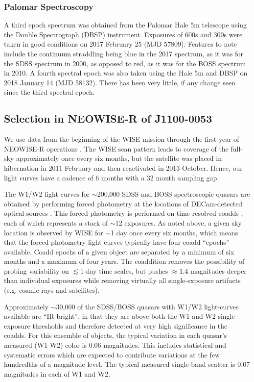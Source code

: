 \documentclass[11pt,a4paper]{article}
\begin{document}
\subsubsection{Palomar Spectroscopy} 
A third epoch spectrum was obtained from the Palomar Hale 5m telescope
using the Double Spectrograph (DBSP) instrument.  Exposures of 600s
and 300s were taken in good conditions on 2017 February 25 (MJD
57809). Features to note include the continuum straddling \mgii being
blue in the 2017 spectrum, as it was for the SDSS spectrum in 2000, as
opposed to red, as it was for the BOSS spectrum in 2010. A fourth
spectral epoch was also taken using the Hale 5m and DBSP on 2018
January 14 (MJD 58132). There has been very little, if any change seen
since the third spectral epoch.


\subsection{Selection in NEOWISE-R of J1100-0053}
We use data from the beginning of the WISE mission \citep[2010
January; ][]{Wright2010} through the first-year of NEOWISE-R
operations \citep[2014 December; ][]{Mainzer2011}. The WISE scan
pattern leads to coverage of the full-sky approximately once every six
months, but the satellite was placed in hibernation in 2011 February
and then reactivated in 2013 October. Hence, our light curves have a
cadence of 6 months with a 32 month sampling gap.

The W1/W2 light curves for $\sim$200,000 SDSS and BOSS spectroscopic
quasars are obtained by performing forced photometry at the locations
of DECam-detected optical sources \citep{Lang2014, Meisner2017a,
Meisner2017b}. This forced photometry is performed on time-resolved
coadds \citep{Lang2014}, each of which represents a stack of $\sim$12
exposures. As noted above, a given sky location is observed by WISE
for $\sim$1 day once every six months, which means that the forced
photometry light curves typically have four coadd ``epochs''
available. Coadd epochs of a given object are separated by a minimum
of six months and a maximum of four years. The coaddition removes the
possibility of probing variability on $\lesssim$1 day time scales, but
pushes $\approx$1.4 magnitudes deeper than individual exposures while
removing virtually all single-exposure artifacts (e.g. cosmic rays and
satellites).

Approximately $\sim$30,000 of the SDSS/BOSS quasars with W1/W2
light-curves available are ``IR-bright'', in that they are above both
the W1 and W2 single exposure thresholds and therefore detected at
very high significance in the coadds. For this ensemble of objects,
the typical variation in each quasar's measured (W1-W2) color is 0.06
magnitudes.  This includes statistical and systematic errors which are
expected to contribute variations at the few hundredths of a magnitude
level. The typical measured single-band scatter is 0.07 magnitudes in
each of W1 and W2.
\end{document}
